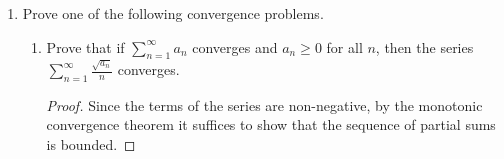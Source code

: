 \documentclass[12pt]{amsart}
\begin{document}
\begin{enumerate}
% 
\begin{proof}
Fix $k\in \mathbb{N}$ and let $r=1+s$, $s>0$. By the binomial theorem, we can approximate the value of $r^n$:
%
\begin{align*}
r^n = (1+s)^n &\ge \binom{n}{k+1}s^k \\
&= \frac{n(n-1)\ldots(n-k+1)}{k!}s^k.
\end{align*}
%
If $n>2k$, then $k < \frac n 2$. Therefore we can observe the properties of the last term in the numerator,
%
\[ (n-k+1) > \frac n 2 + 1 > \frac n 2 \]
%
and it follows that:
%
\[ \frac{n(n-1)\ldots(n-k+1)}{k!} > \frac{n^k}{2^k}\cdot\frac 1 {k!}. \]
%
Hence, we have that:
%
\[ 0 \le \frac{n^k}{r^n} \le \left(\frac 1 {n^k}\right)\left(\frac{2^k k!}{s^k}\right). \]
%
Since:
%
\[ \left\{ \left(\frac 1 {n^k}\right)\left(\frac{2^k k!}{s^k}\right) \right\}_{n=1}^\infty = \left(\frac{2^k k!}{s^k}\right) \left\{\frac 1 {n^k} \right\}_{n=1}^\infty, \]
%
and $\frac 1 {n^k} \to 0$ as $n\to\infty$, it follows from the Squeeze Lemma that $\frac{n^k}{r^n} \to 0$ as $n\to \infty$.

\end{proof}

\item Prove one of the following convergence problems.

\begin{enumerate}  

\item Prove that if $\displaystyle \sum_{n=1}^\infty a_n$ converges and $a_n\geq 0$ for all $n$, then the series $\displaystyle \sum_{n=1}^\infty \frac{\sqrt{a_n}}{n}$ converges.
%
\begin{proof}
Since the terms of the series are non-negative, by the monotonic convergence theorem it suffices to show that the sequence of partial sums is bounded. 


\end{proof}
\end{enumerate}
\end{enumerate}
\end{document}
